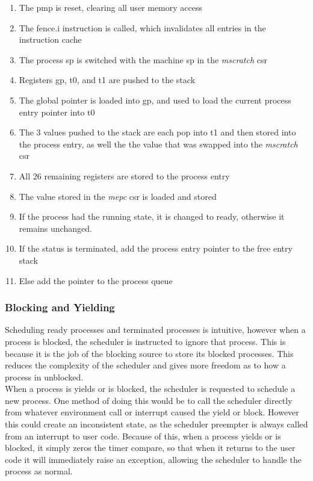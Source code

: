 \begin{enumerate}
    \item The \ac{pmp} is reset, clearing all user memory access
    \item The fence.i instruction is called, which invalidates all entries in the instruction cache
    \item The process sp is switched with the machine sp in the \textit{mscratch} csr
    \item Registers gp, t0, and t1 are pushed to the stack
    \item The global pointer is loaded into gp, and used to load the current process entry pointer into t0
    \item The 3 values pushed to the stack are each pop into t1 and then stored into the process entry, as well the the value that was swapped into the \textit{mscratch} csr
    \item All 26 remaining registers are stored to the process entry
    \item The value stored in the \textit{mepc} csr is loaded and stored
    \item If the process had the running state, it is changed to ready, otherwise it remains unchanged.
    \item If the status is terminated, add the process entry pointer to the free entry stack
    \item Else add the pointer to the process queue
\end{enumerate}
\subsubsection{Blocking and Yielding}
Scheduling ready processes and terminated processes is intuitive, however when a process is blocked, the scheduler is instructed to ignore that process. This is because it is the job of the blocking source to store its blocked processes. This reduces the complexity of the scheduler and gives more freedom as to how a process in unblocked. \\
When a process is yields or is blocked, the scheduler is requested to schedule a new process. One method of doing this would be to call the scheduler directly from whatever environment call or interrupt caused the yield or block. However this could create an inconsistent state, as the scheduler preempter is always called from an interrupt to user code. Because of this, when a process yields or is blocked, it simply zeros the timer compare, so that when it returns to the user code it will immediately raise an exception, allowing the scheduler to handle the process as normal.
